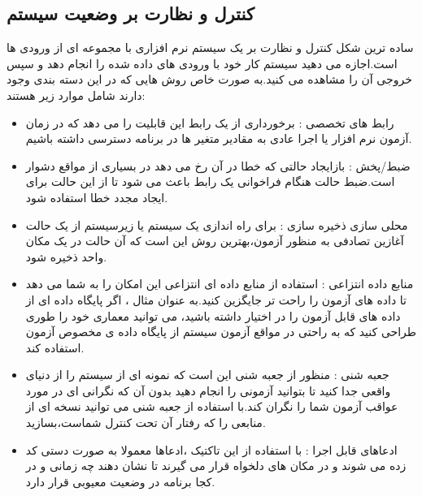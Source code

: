 \subsection{کنترل و نظارت بر وضعیت سیستم}
ساده ترین شکل کنترل و نظارت بر یک سیستم نرم افزاری با مجموعه ای از ورودی ها است.اجازه می دهید سیستم کار خود با ورودی های داده شده را انجام دهد و سپس خروجی آن را مشاهده می کنید.به صورت خاص روش هایی که در این دسته بندی وجود دارند شامل موارد زیر هستند:
\begin{itemize}
\item
رابط های تخصصی :
برخورداری از یک رابط این قابلیت را می دهد که در زمان آزمون نرم افزار یا اجرا عادی به مقادیر متغیر ها در برنامه دسترسی داشته باشیم. 
\item
ضبط/پخش  :
بازایجاد حالتی که خطا در آن رخ می دهد در بسیاری از مواقع دشوار است.ضبط حالت هنگام فراخوانی یک رابط باعث می شود تا از این حالت برای ایجاد مجدد خطا استفاده شود.
\item
محلی سازی ذخیره سازی  :
برای راه اندازی یک سیستم یا زیرسیستم از یک حالت آغازین تصادفی به منظور آزمون،‌بهترین روش این است که آن حالت در یک مکان واحد ذخیره شود.
\item
منابع داده انتزاعی  :
استفاده از منابع داده ای انتزاعی این امکان را به شما می دهد تا داده های آزمون را راحت تر جایگزین کنید.به عنوان مثال ، اگر پایگاه داده ای از داده های قابل آزمون را در اختیار داشته باشید، می توانید معماری خود را طوری طراحی کنید که به راحتی در مواقع آزمون سیستم از پایگاه داده ی مخصوص آزمون استفاده کند.
\item
جعبه شنی  :
منظور از جعبه شنی این است که نمونه ای از سیستم را از دنیای واقعی جدا کنید تا بتوانید آزمونی را انجام دهید بدون آن که نگرانی ای در مورد عواقب آزمون شما را نگران کند.با استفاده از جعبه شنی می توانید نسخه ای از منابعی را که رفتار آن تحت کنترل شماست،‌بسازید.
\item
ادعاهای قابل اجرا  :
با استفاده از این تاکتیک ،‌ادعاها معمولا به صورت دستی کد زده می شوند و در مکان های دلخواه قرار می گیرند تا نشان دهند چه زمانی و در کجا برنامه در وضعیت معیوبی قرار دارد.
\end{itemize}
